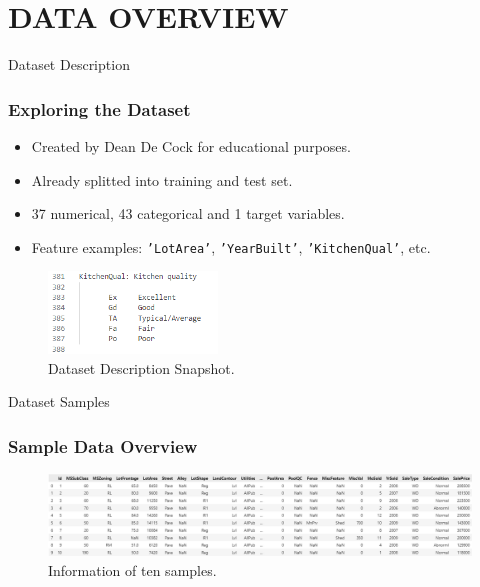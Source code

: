 \section{DATA OVERVIEW}
\label{data_overview_section}


\begin{frame}{Dataset Description}
    \frametitle{Exploring the Dataset}
    \begin{itemize}
        \item Created by Dean De Cock for educational purposes.
        \item Already splitted into training and test set.
        \item 37 numerical, 43 categorical and 1 target variables.
        \item Feature examples: \texttt{'LotArea'}, \texttt{'YearBuilt'}, \texttt{'KitchenQual'}, etc.
    \end{itemize}
    \vspace{0.5cm}
    \begin{figure}
        \includegraphics[width=0.4\textwidth]{figures/data_description.png} 
        \caption{Dataset Description Snapshot.}
        \label{fig:dataset_description_snapshot}
    \end{figure}
\end{frame}


\begin{frame}{Dataset Samples}
    \frametitle{Sample Data Overview}
    \begin{figure}
        \includegraphics[width=1\textwidth]{figures/data_head.png} 
        \caption{Information of ten samples.}
        \label{fig:dataset_head}
    \end{figure}
\end{frame}

